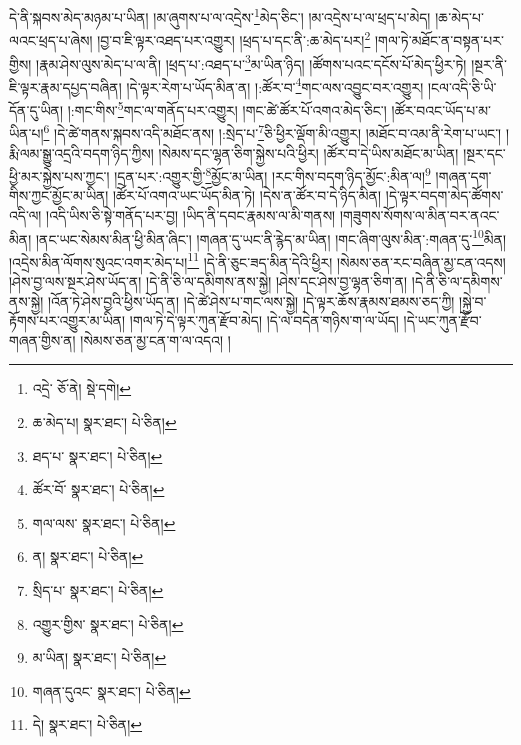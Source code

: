 དེ་ནི་སྐབས་མེད་མཉམ་པ་ཡིན། །མ་ཞུགས་པ་ལ་འདྲེས་\footnote{འདྲེ་  ཅོ་ནེ།  སྡེ་དགེ། }མེད་ཅིང་། །མ་འདྲེས་པ་ལ་ཕྲད་པ་མེད། །ཆ་མེད་པ་ལའང་ཕྲད་པ་ཞེས། །བྱ་བ་ཇི་ལྟར་འཐད་པར་འགྱུར། །ཕྲད་པ་དང་ནི་:ཆ་མེད་པར།\footnote{ཆ་མེད་པ།  སྣར་ཐང་།  པེ་ཅིན། } །གལ་ཏེ་མཐོང་ན་བསྟན་པར་གྱིས། །རྣམ་ཤེས་ལུས་མེད་པ་ལ་ནི། །ཕྲད་པ་:འཐད་པ་\footnote{ཐད་པ་  སྣར་ཐང་།  པེ་ཅིན། }མ་ཡིན་ཉིད། །ཚོགས་པའང་དངོས་པོ་མེད་ཕྱིར་ཏེ། །སྔར་ནི་ཇི་ལྟར་རྣམ་དཔྱད་བཞིན། །དེ་ལྟར་རེག་པ་ཡོད་མིན་ན། །:ཚོར་བ་\footnote{ཚོར་བོ་  སྣར་ཐང་།  པེ་ཅིན། }གང་ལས་འབྱུང་བར་འགྱུར། །ངལ་འདི་ཅི་ཡི་དོན་དུ་ཡིན། །:གང་གིས་\footnote{གལ་ལས་  སྣར་ཐང་།  པེ་ཅིན། }གང་ལ་གནོད་པར་འགྱུར། །གང་ཚེ་ཚོར་པོ་འགའ་མེད་ཅིང་། །ཚོར་བའང་ཡོད་པ་མ་ཡིན་པ།\footnote{ན།  སྣར་ཐང་།  པེ་ཅིན། } །དེ་ཚེ་གནས་སྐབས་འདི་མཐོང་ནས། །:སྲེད་པ་\footnote{སྲིད་པ་  སྣར་ཐང་།  པེ་ཅིན། }ཅི་ཕྱིར་ལྡོག་མི་འགྱུར། །མཐོང་བ་འམ་ནི་རེག་པ་ཡང་། །རྨི་ལམ་སྒྱུ་འདྲའི་བདག་ཉིད་ཀྱིས། །སེམས་དང་ལྷན་ཅིག་སྐྱེས་པའི་ཕྱིར། །ཚོར་བ་དེ་ཡིས་མཐོང་མ་ཡིན། །སྔར་དང་ཕྱི་མར་སྐྱེས་པས་ཀྱང་། །དྲན་པར་:འགྱུར་གྱི་\footnote{འགྱུར་གྱིས་  སྣར་ཐང་།  པེ་ཅིན། }མྱོང་མ་ཡིན། །རང་གིས་བདག་ཉིད་མྱོང་:མིན་ལ།\footnote{མ་ཡིན།  སྣར་ཐང་།  པེ་ཅིན། } །གཞན་དག་གིས་ཀྱང་མྱོང་མ་ཡིན། །ཚོར་པོ་འགའ་ཡང་ཡོད་མིན་ཏེ། །དེས་ན་ཚོར་བ་དེ་ཉིད་མིན། །དེ་ལྟར་བདག་མེད་ཚོགས་འདི་ལ། །འདི་ཡིས་ཅི་སྟེ་གནོད་པར་བྱ། །ཡིད་ནི་དབང་རྣམས་ལ་མི་གནས། །གཟུགས་སོགས་ལ་མིན་བར་ནའང་མིན། །ནང་ཡང་སེམས་མིན་ཕྱི་མིན་ཞིང་། །གཞན་དུ་ཡང་ནི་རྙེད་མ་ཡིན། །གང་ཞིག་ལུས་མིན་:གཞན་དུ་\footnote{གཞན་དུའང་  སྣར་ཐང་།  པེ་ཅིན། }མིན། །འདྲེས་མིན་ལོགས་སུའང་འགར་མེད་པ།\footnote{དེ།  སྣར་ཐང་།  པེ་ཅིན། } །དེ་ནི་ཅུང་ཟད་མིན་དེའི་ཕྱིར། །སེམས་ཅན་རང་བཞིན་མྱ་ངན་འདས། །ཤེས་བྱ་ལས་སྔར་ཤེས་ཡོད་ན། །དེ་ནི་ཅི་ལ་དམིགས་ནས་སྐྱེ། །ཤེས་དང་ཤེས་བྱ་ལྷན་ཅིག་ན། །དེ་ནི་ཅི་ལ་དམིགས་ནས་སྐྱེ། །འོན་ཏེ་ཤེས་བྱའི་ཕྱིས་ཡོད་ན། །དེ་ཚེ་ཤེས་པ་གང་ལས་སྐྱེ། །དེ་ལྟར་ཆོས་རྣམས་ཐམས་ཅད་ཀྱི། །སྐྱེ་བ་རྟོགས་པར་འགྱུར་མ་ཡིན། །གལ་ཏེ་དེ་ལྟར་ཀུན་རྫོབ་མེད། །དེ་ལ་བདེན་གཉིས་ག་ལ་ཡོད། །དེ་ཡང་ཀུན་རྫོབ་གཞན་གྱིས་ན། །སེམས་ཅན་མྱ་ངན་ག་ལ་འདའ། །
